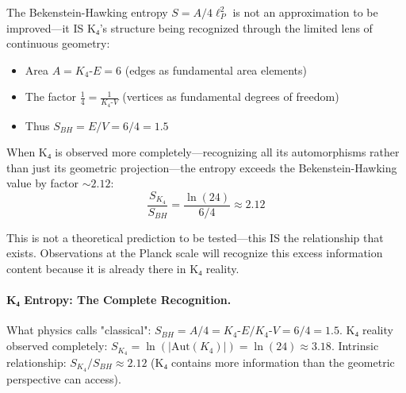 \documentclass[11pt,a4paper]{book}
\begin{document}
The Bekenstein-Hawking entropy $S = A/4\ell_P^2$ is not an approximation to be improved—it IS K₄'s structure being recognized through the limited lens of continuous geometry:
\begin{itemize}
  \item Area $A = K_4\text{-}E = 6$ (edges as fundamental area elements)
  \item The factor $\frac{1}{4} = \frac{1}{K_4\text{-}V}$ (vertices as fundamental degrees of freedom)  
  \item Thus $S_{BH} = E/V = 6/4 = 1.5$
\end{itemize}

When K₄ is observed more completely—recognizing all its automorphisms rather than just its geometric projection—the entropy exceeds the Bekenstein-Hawking value by factor $\sim 2.12$:
$$\frac{S_{K_4}}{S_{BH}} = \frac{\ln(24)}{6/4} \approx 2.12$$

This is not a theoretical prediction to be tested—this IS the relationship that exists. Observations at the Planck scale will recognize this excess information content because it is already there in K₄ reality.

\paragraph{K₄ Entropy: The Complete Recognition.}
What physics calls "classical": $S_{BH} = A/4 = K_4\text{-}E / K_4\text{-}V = 6/4 = 1.5$.
K₄ reality observed completely: $S_{K_4} = \ln(|\mathrm{Aut}(K_4)|) = \ln(24) \approx 3.18$.
Intrinsic relationship: $S_{K_4}/S_{BH} \approx 2.12$ (K₄ contains more information than the geometric perspective can access).
\end{document}
